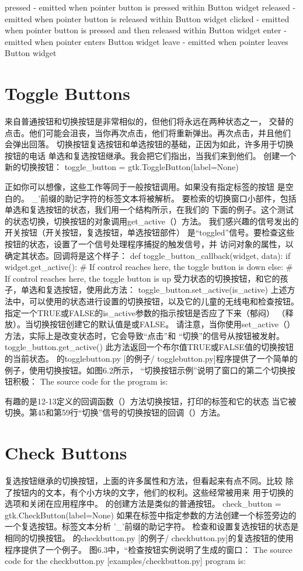pressed - emitted when pointer button is pressed within Button widget
released - emitted when pointer button is released within Button widget
clicked - emitted when pointer button is pressed and then released within Button widget
enter - emitted when pointer enters Button widget
leave - emitted when pointer leaves Button widget
\section{Toggle Buttons}
来自普通按钮和切换按钮是非常相似的，但他们将永远在两种状态之一，
交替的点击。他们可能会沮丧，当你再次点击，他们将重新弹出。再次点击，并且他们
会弹出回落。
切换按钮复选按钮和单选按钮的基础，正因为如此，许多用于切换按钮的电话
单选和复选按钮继承。我会把它们指出，当我们来到他们。
创建一个新的切换按钮：
toggle_button = gtk.ToggleButton(label=None)

正如你可以想像，这些工作等同于一般按钮调用。如果没有指定标签的按钮
是空白的。 _'前缀的助记字符的标签文本将被解析。
要检索的切换窗口小部件，包括单选和复选按钮的状态，我们用一个结构所示，在我们的
下面的例子。这个测试的状态切换，切换按钮的对象调用get_active（）方法。
我们感兴趣的信号发出的开关按钮（开关按钮，复选按钮，单选按钮部件）
是“toggled”信号。要检查这些按钮的状态，设置了一个信号处理程序捕捉的触发信号，并
访问对象的属性，以确定其状态。回调将是这个样子：
def toggle_button_callback(widget, data):
if widget.get_active():
# If control reaches here, the toggle button is down
else:
# If control reaches here, the toggle button is up
受力状态的切换按钮，和它的孩子，单选和复选按钮，使用此方法：
toggle_button.set_active(is_active)
上述方法中，可以使用的状态进行设置的切换按钮，以及它的儿童的无线电和检查按钮。
指定一个TRUE或FALSE的is_active参数的指示按钮是否应了下来（郁闷）
（释放）。当切换按钮创建它的默认值是或FALSE。
请注意，当你使用set_active（）方法，实际上是改变状态时，它会导致“点击”和
“切换”的信号从按钮被发射。
toggle_button.get_active()
此方法返回一个布尔值TRUE或FALSE值的切换按钮的当前状态。
的togglebutton.py [的例子/ togglebutton.py]程序提供了一个简单的例子，使用切换按钮。如图6.2所示，
“切换按钮示例”说明了窗口的第二个切换按钮积极：
The source code for the program is:


有趣的是12-13定义的回调函数（）方法切换按钮，打印的标签和它的状态
当它被切换。第45和第59行“切换”信号的切换按钮的回调（）方法。
\section{Check Buttons}
复选按钮继承的切换按钮，上面的许多属性和方法，但看起来有点不同。比较
除了按钮内的文本，有个小方块的文字，他们的权利。这些经常被用来
用于切换的选项和关闭在应用程序中。
的创建方法是类似的普通按钮。
check_button = gtk.CheckButton(label=None)
如果在标签中指定参数的方法创建一个标签旁边的一个复选按钮。标签文本分析
'_'前缀的助记字符。
检查和设置复选按钮的状态是相同的切换按钮。
的checkbutton.py [的例子/ checkbutton.py]的复选按钮的使用程序提供了一个例子。
图6.3中，“检查按钮实例说明了生成的窗口：
The source code for the checkbutton.py [examples/checkbutton.py] program is:


